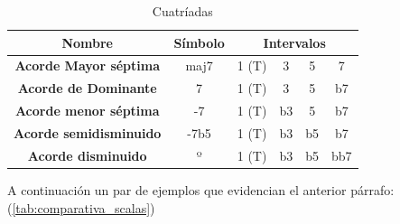 \begin{table}[h]
    \centering
    \begin{tabular}{c|c|c|c|c|c}       
        \textbf{Nombre} & \textbf{Símbolo} & \multicolumn{4}{c}{\textbf{Intervalos}} \\
        \hline
        \hline
        \textbf{Acorde Mayor séptima} & maj7 & 1 (T) & 3 & 5 & 7\\
        \hline
        \textbf{Acorde de Dominante} & 7 & 1 (T) & 3 & 5 & b7\\
        \hline
        \textbf{Acorde menor séptima} & -7 & 1 (T) & b3 & 5 & b7 \\
        \hline
        \textbf{Acorde semidisminuido} & -7b5 & 1 (T) & b3 & b5 & b7 \\
        \hline
        \textbf{Acorde disminuido} & º & 1 (T) & b3 & b5 & bb7 \\
    \end{tabular}
    \caption{Cuatríadas}
    \label{tab:cuatriads}
\end{table}

A continuación un par de ejemplos que evidencian el anterior párrafo: (\ref{tab:comparativa_scalas}) 

